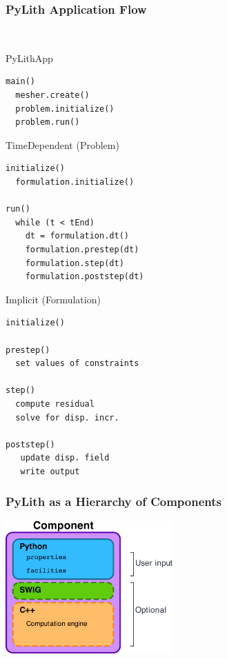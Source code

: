 \documentclass{beamer}
\begin{document}
\begin{frame}[fragile]
  \frametitle{PyLith Application Flow}
  \summary{}
 
{\small\tt
  \begin{minipage}[t]{2.0in}
      \begin{block}{PyLithApp}
        \begin{verbatim}
main()
  mesher.create()
  problem.initialize()
  problem.run()
\end{verbatim}
    \end{block}
    \begin{block}{TimeDependent (Problem)}
    \begin{verbatim}
initialize()
  formulation.initialize()

run()
  while (t < tEnd)
    dt = formulation.dt()
    formulation.prestep(dt)
    formulation.step(dt)
    formulation.poststep(dt)
\end{verbatim}
  \end{block}
\end{minipage}
  \hfill
  \begin{minipage}[t]{2.0in}
    \begin{block}{Implicit (Formulation)}
      \begin{verbatim}
initialize()

prestep()
  set values of constraints

step()
  compute residual
  solve for disp. incr.

poststep()
   update disp. field
   write output
\end{verbatim}
    \end{block}
  \end{minipage}
}

\end{frame}


\begin{frame}
  \frametitle{PyLith as a Hierarchy of Components}

  \vfill
  \begin{center}
    \includegraphics[height=2.0in]{figs/component}
  \end{center}  
  \vfill

\end{frame}
\end{document}
